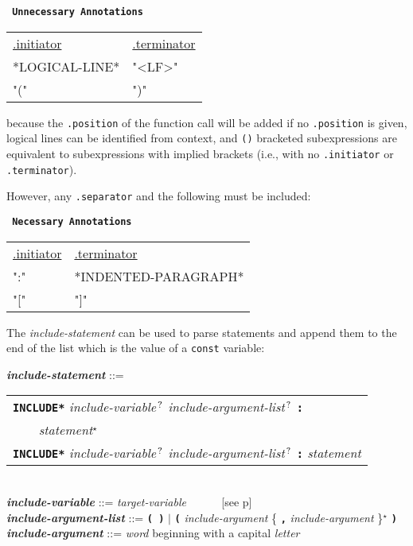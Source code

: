 \documentclass[12pt]{article}
\newcommand{\TT}[1]{{\tt \bfseries #1}}
\newcommand{\STAR}{{\Large $^\star$}}
\newcommand{\QMARK}{{$^{\,\mbox{\footnotesize ?}}$}}
\newcommand{\emkey}[1]{{\em \bfseries #1}}
\newcommand{\pagref}[1]{p\pageref{#1}}
\newenvironment{indpar}[1][0.3in]%
	{\begin{list}{}%
		     {\setlength{\itemsep}{0in}%
		      \setlength{\topsep}{0in}%
		      \setlength{\parsep}{1ex}%
		      \setlength{\labelwidth}{#1}%
		      \setlength{\leftmargin}{#1}%
		      \addtolength{\leftmargin}{\labelsep}}%
	 \item}%
	{\end{list}}
\begin{document}
\begin{center} \tt
{\rm \bf Unnecessary Annotations}\label{UNNECESSARY-ANNOTATIONS}
\\[1ex]
\begin{tabular}{l@{~~~~~~~~~~}l}
\underline{.initiator} & \underline{.terminator}
\\[1ex]
*LOGICAL-LINE* & "<LF>" \\
"(" & ")" \\
\end{tabular}
\end{center}

because the {\tt .position} of the function call will be added
if no {\tt .position} is given,
logical lines can be identified from context, and
{\tt ()} bracketed subexpressions are equivalent to
subexpressions with implied brackets (i.e., with no
{\tt .initiator} or {\tt .terminator}).

However, any {\tt .separator} and the following must be included:

\begin{center} \tt
{\rm \bf Necessary Annotations}
\\[1ex]
\begin{tabular}{l@{~~~~~~~~~~}l}
\underline{.initiator} & \underline{.terminator}
\\[1ex]
":" & *INDENTED-PARAGRAPH* \\
"[" & "]" \\
\end{tabular}
\end{center}


The {\em include-statement} can be used to parse statements
and append them to the end of the list which is the value of
a {\tt const} variable:

\begin{indpar}
\emkey{include-statement}\label{INCLUDE-STATEMENT} ::= \\
\hspace*{0.3in}
    \begin{tabular}[t]{l}
    \TT{*INCLUDE*} {\em include-variable}\QMARK{}
    	{\em include-argument-list}\QMARK{} \TT{:} \\
    \TT{~~~~}{\em statement}\STAR{} \\
    \TT{*INCLUDE*}  {\em include-variable}\QMARK{}
    	{\em include-argument-list}\QMARK{} \TT{:}
	{\em statement} \\
    \end{tabular}
\\[0.5ex]
\emkey{include-variable} ::= {\em target-variable}
	~~~~~ [see \pagref{TARGET-VARIABLE}]
\\[0.5ex]
\emkey{include-argument-list} ::= \TT{( )} $|$
	\TT{(} {\em include-argument}
	\{ \TT{,} {\em include-argument} \}\STAR{} \TT{)}
\\[0.5ex]
\emkey{include-argument} ::= {\em word} beginning with a capital {\em letter}

\end{indpar}
\end{document}
